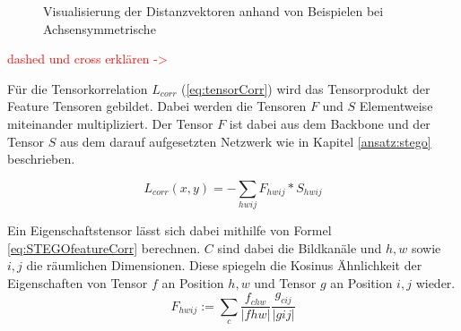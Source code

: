 		\begin{figure}[h!]
			\centering
			\qquad
			\caption{Visualisierung der Distanzvektoren anhand von Beispielen bei Achsensymmetrische}
			\label{fig:stegoachsensym}
		\end{figure}
		
		\textcolor{red}{dashed und cross erklären ->}
		
		Für die Tensorkorrelation $L_{corr}$ (\ref{eq:tensorCorr}) wird das Tensorprodukt der Feature Tensoren gebildet. Dabei werden die Tensoren $F$ und $S$ Elementweise miteinander multipliziert\cite{STEGOhamilton2022unsupervised}. Der Tensor $F$ ist dabei aus dem Backbone und der Tensor $S$ aus dem darauf aufgesetzten Netzwerk wie in Kapitel \ref{ansatz:stego} beschrieben. 
		
		\begin{equation}
			L_{corr}(x, y) = - \sum_{hwij}{F_{hwij} * S_{hwij}}
			\label{eq:tensorCorr}
		\end{equation}
		
		Ein Eigenschaftstensor lässt sich dabei mithilfe von Formel \ref{eq:STEGOfeatureCorr} berechnen. $C$ sind dabei die Bildkanäle und $h,w$ sowie $i,j$ die räumlichen Dimensionen. Diese spiegeln die Kosinus Ähnlichkeit der Eigenschaften von Tensor $f$ an Position $h,w$ und Tensor $g$ an Position $i,j$ wieder. 
		\begin{equation}
			F_{hwij} := \sum_{c} \frac{f_{chw}}{|f{hw}|} \frac{g_{cij}}{|g{ij}|}
			\label{eq:STEGOfeatureCorr}
		\end{equation}
		
		
		
		


